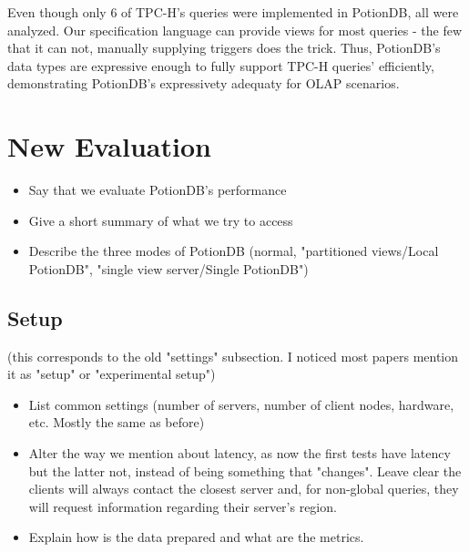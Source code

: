 \documentclass[sigplan,10pt]{acmart}
\begin{document}
Even though only 6 of TPC-H’s queries were implemented in PotionDB, all were analyzed.
Our specification language can provide views for most queries - the few that it can not, manually supplying triggers does the trick.
Thus, PotionDB's data types are expressive enough to fully support TPC-H queries' efficiently, demonstrating PotionDB's expressivety adequaty for OLAP scenarios. %

\section{New Evaluation}

%
%

\begin{itemize}
	\item Say that we evaluate PotionDB's performance
	\item Give a short summary of what we try to access
	\item Describe the three modes of PotionDB (normal, "partitioned views/Local PotionDB", "single view server/Single PotionDB")
\end{itemize}

\subsection{Setup}

(this corresponds to the old "settings" subsection. I noticed most papers mention it as "setup" or "experimental setup")

\begin{itemize}
	\item List common settings (number of servers, number of client nodes, hardware, etc. Mostly the same as before)
	\item Alter the way we mention about latency, as now the first tests have latency but the latter not, instead of being something that "changes". Leave clear the clients will always contact the closest server and, for non-global queries, they will request information regarding their server's region.
	\item Explain how is the data prepared and what are the metrics.
\end{itemize}
\end{document}
